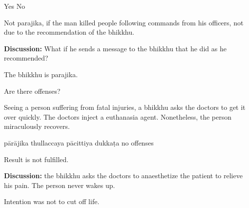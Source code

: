\begin{exam}{\autoExamName}
\begin{problem*}
\begin{parts}
    \bigskip

    \begin{answers}{2}
      \bChoices
       Yes\eAns
       No\eAns
      \eChoices
    \end{answers}

    \bigskip

    \begin{solution}
      Not parajika, if the man killed people following commands from his officers, not due to the recommendation of the bhikkhu.
    \end{solution}

    \textbf{Discussion:} What if he sends a message to the bhikkhu that he did
    as he recommended?

    \begin{solution}
      The bhikkhu is parajika.
    \end{solution}

  \end{parts}

\end{problem*}

\begin{problem*}

  Are there offenses?

\begin{parts}

  \item Seeing a person suffering from fatal injuries, a bhikkhu asks the doctors to
  get it over quickly. The doctors inject a euthanasia agent. Nonetheless, the person
  miraculously recovers.

  \bigskip

  \begin{answers}{5}
    \bChoices
     pārājika\eAns
     thullaccaya\eAns
     pācittiya\eAns
     dukkaṭa\eAns
     no offenses\eAns
    \eChoices
  \end{answers}

  \begin{solution}
    Result is not fulfilled.
  \end{solution}

  \bigskip

  \textbf{Discussion:} the bhikkhu asks the doctors to anaesthetize the patient to relieve his pain. The person never wakes up.

  \begin{solution}
    Intention was not to cut off life.
  \end{solution}


\end{parts}
\end{problem*}
\end{exam}
